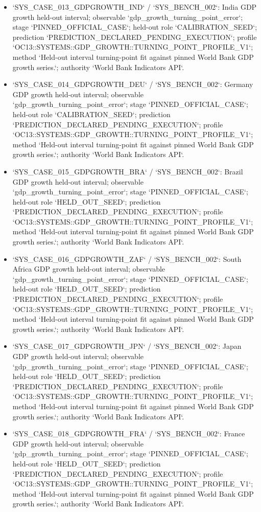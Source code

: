 \begin{itemize}
\item `SYS\_CASE\_013\_GDPGROWTH\_IND` / `SYS\_BENCH\_002`: India GDP growth held-out interval; observable `gdp\_growth\_turning\_point\_error`; stage `PINNED\_OFFICIAL\_CASE`; held-out role `CALIBRATION\_SEED`; prediction `PREDICTION\_DECLARED\_PENDING\_EXECUTION`; profile `OC13::SYSTEMS::GDP\_GROWTH::TURNING\_POINT\_PROFILE\_V1`; method `Held-out interval turning-point fit against pinned World Bank GDP growth series.`; authority `World Bank Indicators API`.
\item `SYS\_CASE\_014\_GDPGROWTH\_DEU` / `SYS\_BENCH\_002`: Germany GDP growth held-out interval; observable `gdp\_growth\_turning\_point\_error`; stage `PINNED\_OFFICIAL\_CASE`; held-out role `CALIBRATION\_SEED`; prediction `PREDICTION\_DECLARED\_PENDING\_EXECUTION`; profile `OC13::SYSTEMS::GDP\_GROWTH::TURNING\_POINT\_PROFILE\_V1`; method `Held-out interval turning-point fit against pinned World Bank GDP growth series.`; authority `World Bank Indicators API`.
\item `SYS\_CASE\_015\_GDPGROWTH\_BRA` / `SYS\_BENCH\_002`: Brazil GDP growth held-out interval; observable `gdp\_growth\_turning\_point\_error`; stage `PINNED\_OFFICIAL\_CASE`; held-out role `HELD\_OUT\_SEED`; prediction `PREDICTION\_DECLARED\_PENDING\_EXECUTION`; profile `OC13::SYSTEMS::GDP\_GROWTH::TURNING\_POINT\_PROFILE\_V1`; method `Held-out interval turning-point fit against pinned World Bank GDP growth series.`; authority `World Bank Indicators API`.
\item `SYS\_CASE\_016\_GDPGROWTH\_ZAF` / `SYS\_BENCH\_002`: South Africa GDP growth held-out interval; observable `gdp\_growth\_turning\_point\_error`; stage `PINNED\_OFFICIAL\_CASE`; held-out role `HELD\_OUT\_SEED`; prediction `PREDICTION\_DECLARED\_PENDING\_EXECUTION`; profile `OC13::SYSTEMS::GDP\_GROWTH::TURNING\_POINT\_PROFILE\_V1`; method `Held-out interval turning-point fit against pinned World Bank GDP growth series.`; authority `World Bank Indicators API`.
\item `SYS\_CASE\_017\_GDPGROWTH\_JPN` / `SYS\_BENCH\_002`: Japan GDP growth held-out interval; observable `gdp\_growth\_turning\_point\_error`; stage `PINNED\_OFFICIAL\_CASE`; held-out role `HELD\_OUT\_SEED`; prediction `PREDICTION\_DECLARED\_PENDING\_EXECUTION`; profile `OC13::SYSTEMS::GDP\_GROWTH::TURNING\_POINT\_PROFILE\_V1`; method `Held-out interval turning-point fit against pinned World Bank GDP growth series.`; authority `World Bank Indicators API`.
\item `SYS\_CASE\_018\_GDPGROWTH\_FRA` / `SYS\_BENCH\_002`: France GDP growth held-out interval; observable `gdp\_growth\_turning\_point\_error`; stage `PINNED\_OFFICIAL\_CASE`; held-out role `HELD\_OUT\_SEED`; prediction `PREDICTION\_DECLARED\_PENDING\_EXECUTION`; profile `OC13::SYSTEMS::GDP\_GROWTH::TURNING\_POINT\_PROFILE\_V1`; method `Held-out interval turning-point fit against pinned World Bank GDP growth series.`; authority `World Bank Indicators API`.

\end{itemize}

